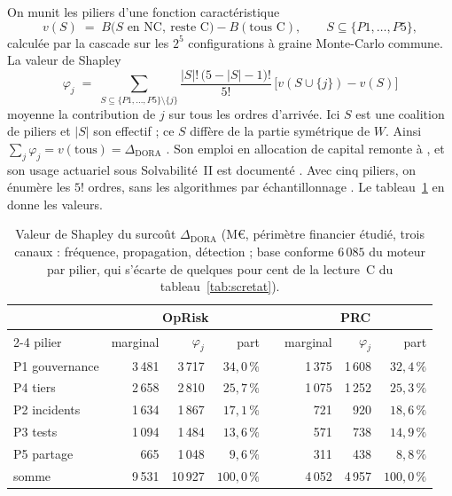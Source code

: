 On munit les piliers d'une fonction caractéristique
\[
v(S) \;=\; B\bigl(S \text{ en NC},\ \text{reste C}\bigr)-B(\text{tous C}),
\qquad S \subseteq \{P1,\dots,P5\},
\]
calculée par la cascade sur les $2^5$ configurations à graine Monte-Carlo commune. La valeur de
Shapley
\[
\varphi_j \;=\; \sum_{S \subseteq \{P1,\dots,P5\}\setminus\{j\}}
\frac{|S|!\,\bigl(5-|S|-1\bigr)!}{5!}\,\bigl[v(S\cup\{j\})-v(S)\bigr]
\]
moyenne la contribution de $j$ sur tous les ordres d'arrivée. Ici $S$ est une coalition de piliers et $|S|$ son effectif ; ce $S$ diffère de la partie symétrique de $W$. Ainsi
$\sum_j \varphi_j = v(\text{tous}) = \Delta_{\text{DORA}}$ \citep{Shapley1953}. Son
emploi en allocation de capital remonte à \citet{denault2001}, et son usage actuariel sous
Solvabilité~II est documenté \citep{Decupere2011}. Avec cinq piliers, on énumère les $5!$
ordres, sans les algorithmes par échantillonnage \citep{CastroGomezTejada2009, SongNelsonStaum2016}.
Le tableau~\ref{tab:shapley} en donne les valeurs.

\begin{table}[H]\centering\small
\renewcommand{\arraystretch}{1.25}
\begin{tabular}{@{}l rrr c rrr@{}}
\toprule
& \multicolumn{3}{c}{OpRisk} & & \multicolumn{3}{c}{PRC} \\
\cmidrule{2-4}\cmidrule{6-8}
pilier & marginal & $\varphi_j$ & part & & marginal & $\varphi_j$ & part \\
\midrule
P1 gouvernance & 3\,481 & 3\,717 & $34{,}0\,\%$ & & 1\,375 & 1\,608 & $32{,}4\,\%$ \\
P4 tiers       & 2\,658 & 2\,810 & $25{,}7\,\%$ & & 1\,075 & 1\,252 & $25{,}3\,\%$ \\
P2 incidents   & 1\,634 & 1\,867 & $17{,}1\,\%$ & &  721 &  920 & $18{,}6\,\%$ \\
P3 tests       & 1\,094 & 1\,484 & $13{,}6\,\%$ & &  571 &  738 & $14{,}9\,\%$ \\
P5 partage     &  665 & 1\,048 &  $9{,}6\,\%$ & &  311 &  438 &  $8{,}8\,\%$ \\
\midrule
somme          & 9\,531 & 10\,927 & $100{,}0\,\%$ & & 4\,052 & 4\,957 & $100{,}0\,\%$ \\
\bottomrule
\end{tabular}
\caption{Valeur de Shapley du surcoût $\Delta_{\text{DORA}}$ (M\euro, périmètre financier étudié, trois canaux : fréquence, propagation, détection ; base
conforme $6\,085$ du moteur par pilier, qui s'écarte de quelques pour cent de la lecture~C du tableau~\ref{tab:scretat}).}
\label{tab:shapley}
\end{table}

